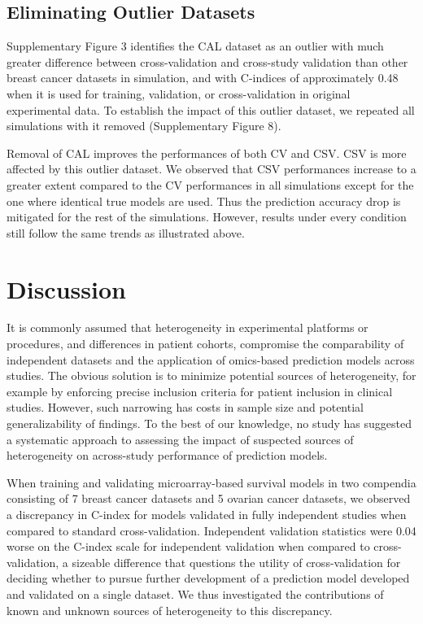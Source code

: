 \documentclass{bioinfo}
\begin{document}
  \subsection{Eliminating Outlier Datasets}
  Supplementary Figure 3 identifies the CAL dataset as an outlier with
  much greater difference between cross-validation and cross-study
  validation than other breast cancer datasets in simulation, and with C-indices of
  approximately 0.48 when it is used for training, validation, or
  cross-validation in original experimental data.  To establish the
  impact of this outlier dataset, we repeated all simulations with it
  removed (Supplementary Figure 8). %

  Removal of CAL improves the performances of both CV and CSV. CSV is more affected by this outlier dataset. We observed that CSV performances increase to a greater extent compared to the CV performances in all simulations except for the one where identical true models are used. Thus the
  prediction accuracy drop is mitigated for the rest of the simulations. However, results under 
  every condition still follow the same trends as illustrated above.
  
\section{Discussion}

It is commonly assumed that heterogeneity in experimental platforms or
procedures, and differences in patient cohorts, compromise the
comparability of independent datasets and the application of
omics-based prediction models across studies.  The obvious solution is
to minimize potential sources of heterogeneity, for example by
enforcing precise inclusion criteria for patient inclusion in clinical
studies.  However, such narrowing has costs in sample size and
potential generalizability of findings.  To the best of our knowledge,
no study has suggested a systematic approach to assessing the impact
of suspected sources of heterogeneity on across-study performance of
prediction models.

When training and validating microarray-based survival models in two 
compendia consisting of 7 breast cancer datasets and 5 ovarian cancer datasets,  
we observed a discrepancy in C-index for models validated in fully
independent studies when compared to standard cross-validation.
Independent validation statistics were 0.04 worse on the
C-index scale for independent validation when compared to
cross-validation, a sizeable difference that questions the utility 
of cross-validation for deciding whether to
pursue further development of a prediction model developed and
validated on a single dataset. We thus investigated the contributions of
known and unknown sources of heterogeneity to this discrepancy.
\end{document}
